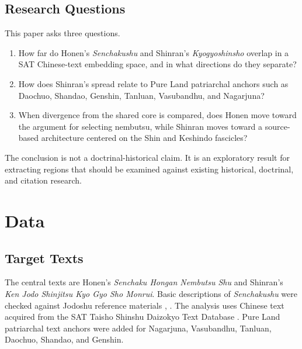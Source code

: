 \documentclass[uplatex,dvipdfmx,11pt,a4paper]{jsarticle}
\begin{document}
\subsection{Research Questions}

This paper asks three questions.

\begin{enumerate}
\item How far do Honen's \emph{Senchakushu} and Shinran's \emph{Kyogyoshinsho} overlap in a SAT Chinese-text embedding space, and in what directions do they separate?
\item How does Shinran's spread relate to Pure Land patriarchal anchors such as Daochuo, Shandao, Genshin, Tanluan, Vasubandhu, and Nagarjuna?
\item When divergence from the shared core is compared, does Honen move toward the argument for selecting nembutsu, while Shinran moves toward a source-based architecture centered on the Shin and Keshindo fascicles?
\end{enumerate}

The conclusion is not a doctrinal-historical claim. It is an exploratory result for extracting regions that should be examined against existing historical, doctrinal, and citation research.

\section{Data}

\subsection{Target Texts}

The central texts are Honen's \emph{Senchaku Hongan Nembutsu Shu} and Shinran's \emph{Ken Jodo Shinjitsu Kyo Gyo Sho Monrui}. Basic descriptions of \emph{Senchakushu} were checked against Jodoshu reference materials \cite{jodoshuzensho-senchaku}, \cite{jodoshu-senchaku}. The analysis uses Chinese text acquired from the SAT Taisho Shinshu Daizokyo Text Database \cite{sat}. Pure Land patriarchal text anchors were added for Nagarjuna, Vasubandhu, Tanluan, Daochuo, Shandao, and Genshin.
\end{document}
